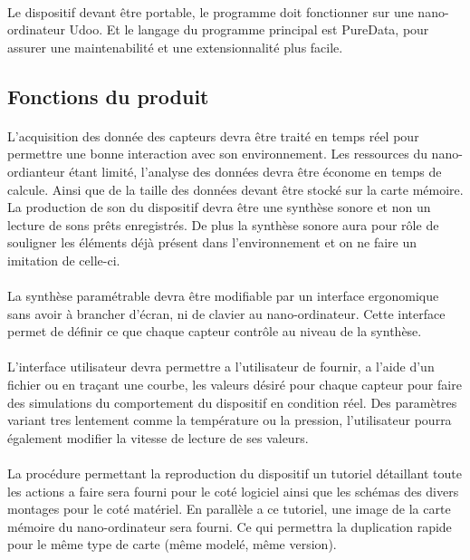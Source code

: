 \documentclass[a4paper, titlepage, oneside, 12pt]{article}%
\begin{document}
\paragraph{}
Le dispositif devant être portable, le programme doit fonctionner sur une nano-ordinateur Udoo. Et le langage du programme principal est PureData, pour assurer une maintenabilité et une extensionnalité plus facile.



\subsection{Fonctions du produit}
\paragraph{}
L’acquisition des donnée des capteurs devra être traité en temps réel pour permettre une bonne interaction avec son environnement. Les ressources du nano-ordianteur étant limité, l'analyse des données devra être économe en temps de calcule. Ainsi que de la taille des données devant être stocké sur la carte mémoire.\\
La production de son du dispositif devra être une synthèse sonore et non un lecture de sons prêts enregistrés. De plus la synthèse sonore aura pour rôle de souligner les éléments déjà présent dans l’environnement  et on ne faire un imitation de celle-ci.

\paragraph{}
La synthèse paramétrable devra être modifiable par un interface ergonomique sans avoir à brancher d’écran, ni de clavier au nano-ordinateur. Cette interface permet de définir ce que chaque capteur contrôle au niveau de la synthèse.

\paragraph{}
L'interface utilisateur devra permettre a l'utilisateur de fournir, a l'aide d'un fichier ou en traçant une courbe, les valeurs désiré pour chaque capteur pour faire des simulations du comportement du dispositif en condition réel. Des paramètres variant tres lentement comme la température ou la pression, l'utilisateur pourra également modifier la vitesse de lecture de ses valeurs.

\paragraph{}
La procédure permettant la reproduction du dispositif un tutoriel détaillant toute les actions a faire sera fourni pour le coté logiciel ainsi que les schémas des divers montages pour le coté matériel. En parallèle a ce tutoriel, une image de la carte mémoire du nano-ordinateur sera fourni. Ce qui permettra la duplication rapide pour le même type de carte (même modelé, même version).
\end{document}
